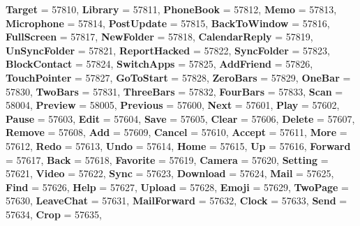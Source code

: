 \begin{DoxyCompactItemize}
{\bfseries Target} = 57810, 
{\bfseries Library} = 57811, 
{\bfseries Phone\+Book} = 57812, 
\newline
{\bfseries Memo} = 57813, 
{\bfseries Microphone} = 57814, 
{\bfseries Post\+Update} = 57815, 
{\bfseries Back\+To\+Window} = 57816, 
\newline
{\bfseries Full\+Screen} = 57817, 
{\bfseries New\+Folder} = 57818, 
{\bfseries Calendar\+Reply} = 57819, 
{\bfseries Un\+Sync\+Folder} = 57821, 
\newline
{\bfseries Report\+Hacked} = 57822, 
{\bfseries Sync\+Folder} = 57823, 
{\bfseries Block\+Contact} = 57824, 
{\bfseries Switch\+Apps} = 57825, 
\newline
{\bfseries Add\+Friend} = 57826, 
{\bfseries Touch\+Pointer} = 57827, 
{\bfseries Go\+To\+Start} = 57828, 
{\bfseries Zero\+Bars} = 57829, 
\newline
{\bfseries One\+Bar} = 57830, 
{\bfseries Two\+Bars} = 57831, 
{\bfseries Three\+Bars} = 57832, 
{\bfseries Four\+Bars} = 57833, 
\newline
{\bfseries Scan} = 58004, 
{\bfseries Preview} = 58005, 
{\bfseries Previous} = 57600, 
{\bfseries Next} = 57601, 
\newline
{\bfseries Play} = 57602, 
{\bfseries Pause} = 57603, 
{\bfseries Edit} = 57604, 
{\bfseries Save} = 57605, 
\newline
{\bfseries Clear} = 57606, 
{\bfseries Delete} = 57607, 
{\bfseries Remove} = 57608, 
{\bfseries Add} = 57609, 
\newline
{\bfseries Cancel} = 57610, 
{\bfseries Accept} = 57611, 
{\bfseries More} = 57612, 
{\bfseries Redo} = 57613, 
\newline
{\bfseries Undo} = 57614, 
{\bfseries Home} = 57615, 
{\bfseries Up} = 57616, 
{\bfseries Forward} = 57617, 
\newline
{\bfseries Back} = 57618, 
{\bfseries Favorite} = 57619, 
{\bfseries Camera} = 57620, 
{\bfseries Setting} = 57621, 
\newline
{\bfseries Video} = 57622, 
{\bfseries Sync} = 57623, 
{\bfseries Download} = 57624, 
{\bfseries Mail} = 57625, 
\newline
{\bfseries Find} = 57626, 
{\bfseries Help} = 57627, 
{\bfseries Upload} = 57628, 
{\bfseries Emoji} = 57629, 
\newline
{\bfseries Two\+Page} = 57630, 
{\bfseries Leave\+Chat} = 57631, 
{\bfseries Mail\+Forward} = 57632, 
{\bfseries Clock} = 57633, 
\newline
{\bfseries Send} = 57634, 
{\bfseries Crop} = 57635, 

\end{DoxyCompactItemize}
